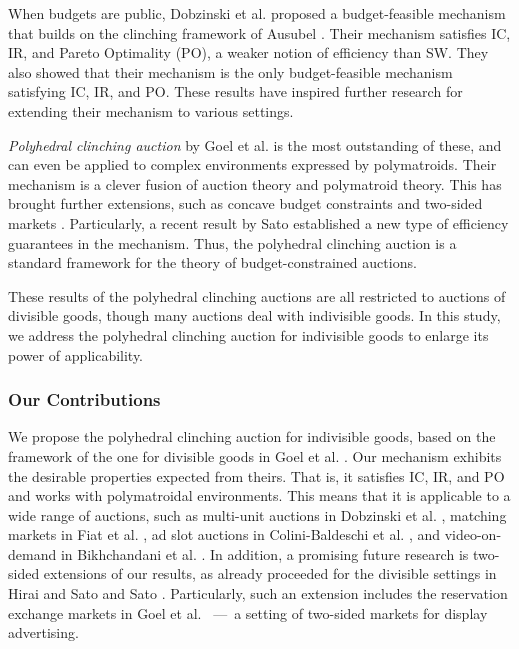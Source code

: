 \documentclass[letterpaper,11pt]{article}
\begin{document}
When budgets are public, 
Dobzinski et al. \cite{DLN2012} proposed a budget-feasible mechanism that 
builds on the clinching framework of Ausubel \cite{A2004}. 
Their mechanism satisfies IC, IR, and Pareto Optimality (PO), 
a weaker notion of efficiency than SW. 
They also showed that their mechanism is the only budget-feasible mechanism satisfying IC, IR, and PO. 
These results have inspired further research \cite{BHLS2015, DHS2015, FLSS2011, GMP2014, GMP2015, GMP2020, HS2022} for extending their mechanism to various settings.

{\it Polyhedral clinching auction} by Goel et al. \cite{GMP2015} is the most outstanding of these, 
and can even be applied to complex environments expressed by polymatroids. 
Their mechanism is a clever fusion of auction theory and polymatroid theory. 
This has brought  further extensions, such as concave budget constraints \cite{GMP2014} and two-sided markets \cite{HS2022, S2023}. 
Particularly, a recent result by Sato \cite{S2023} established a new type of efficiency guarantees in the mechanism. 
Thus, the polyhedral clinching auction is a standard framework for the theory of budget-constrained auctions. 

These results of the polyhedral clinching auctions are all restricted to auctions of divisible goods, though many auctions deal with indivisible goods. In this study, we address the polyhedral clinching auction for indivisible goods to enlarge its power of applicability.

\subsubsection*{Our Contributions}
We propose the polyhedral clinching auction for indivisible goods, 
based on the framework of the one for divisible goods in Goel et al. \cite{GMP2015}. 
Our mechanism exhibits the desirable properties expected from theirs.
That is, it satisfies IC, IR, and PO and works with polymatroidal environments. 
This means that it is applicable to a wide range of auctions, such as 
multi-unit auctions in Dobzinski et al. \cite{DLN2012}, matching markets in Fiat et al. \cite{FLSS2011}, 
ad slot auctions in Colini-Baldeschi et al. \cite{BHLS2015}, and video-on-demand in Bikhchandani et al. \cite{BSV2011}.
In addition, a promising future research is two-sided extensions of our results, 
as already proceeded for the divisible settings in Hirai and Sato \cite{HS2022} and Sato \cite{S2023}.
Particularly, such an extension includes the reservation exchange markets in Goel et al. \cite{GLMNP2016}\ ---\ a setting of two-sided markets for display advertising. 
\end{document}
